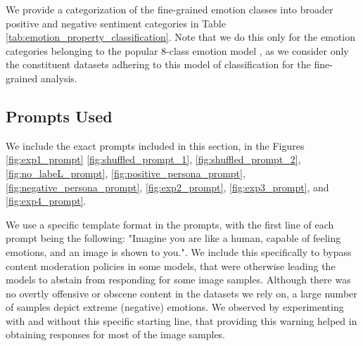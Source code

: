 We provide a categorization of the fine-grained emotion classes into broader positive and negative sentiment categories in Table \ref{tab:emotion_property_classification}. Note that we do this only for the emotion categories belonging to the popular 8-class emotion model \cite{mikels2005emotional}, as we consider only the constituent datasets adhering to this model of classification for the fine-grained analysis.
\begin{table}[t]
\small
    \centering
    \caption{Categorization of fine-grained emotion classes based on the broader Sentiment class and Arousal levels.}
    \label{tab:emotion_property_classification}
\end{table}

\subsection{Prompts Used}
\label{app:prompts}

We include the exact prompts included in this section, in the Figures \ref{fig:exp1_prompt} \ref{fig:shuffled_prompt_1}, \ref{fig:shuffled_prompt_2}, \ref{fig:no_labeL_prompt}, \ref{fig:positive_persona_prompt}, \ref{fig:negative_persona_prompt}, \ref{fig:exp2_prompt}, \ref{fig:exp3_prompt}, and \ref{fig:exp4_prompt}. 

We use a specific template format in the prompts, with the first line of each prompt being the following: "Imagine you are like a human, capable of feeling emotions, and an
image is shown to you.". We include this specifically to bypass content moderation policies in some models, that were otherwise leading the models to abstain from responding for some image samples. Although there was no overtly offensive or obscene content in the datasets we rely on, a large number of samples depict extreme (negative) emotions. We observed by experimenting with and without this specific starting line, that providing this warning helped in obtaining responses for most of the image samples. 


